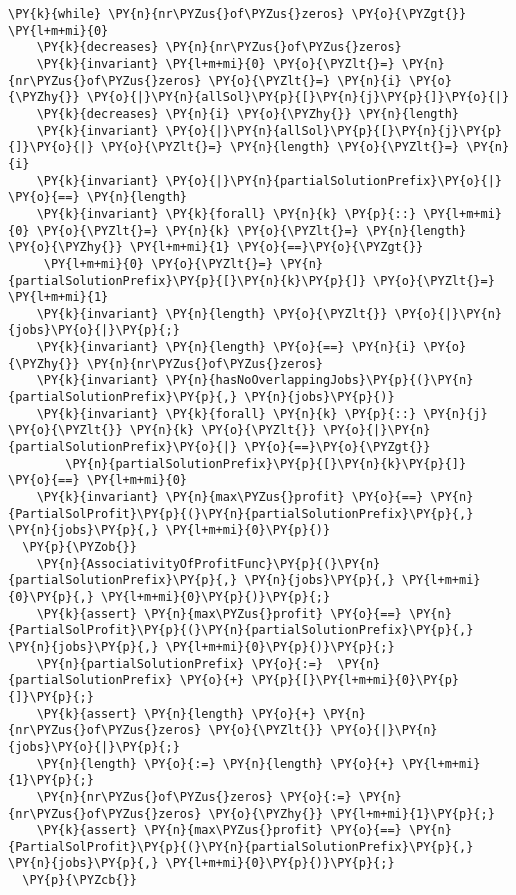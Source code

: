 \begin{Verbatim}[commandchars=\\\{\}, fontsize=\small]
  \PY{k}{while} \PY{n}{nr\PYZus{}of\PYZus{}zeros} \PY{o}{\PYZgt{}} \PY{l+m+mi}{0}
    \PY{k}{decreases} \PY{n}{nr\PYZus{}of\PYZus{}zeros}
    \PY{k}{invariant} \PY{l+m+mi}{0} \PY{o}{\PYZlt{}=} \PY{n}{nr\PYZus{}of\PYZus{}zeros} \PY{o}{\PYZlt{}=} \PY{n}{i} \PY{o}{\PYZhy{}} \PY{o}{|}\PY{n}{allSol}\PY{p}{[}\PY{n}{j}\PY{p}{]}\PY{o}{|} 
    \PY{k}{decreases} \PY{n}{i} \PY{o}{\PYZhy{}} \PY{n}{length}
    \PY{k}{invariant} \PY{o}{|}\PY{n}{allSol}\PY{p}{[}\PY{n}{j}\PY{p}{]}\PY{o}{|} \PY{o}{\PYZlt{}=} \PY{n}{length} \PY{o}{\PYZlt{}=} \PY{n}{i} 
    \PY{k}{invariant} \PY{o}{|}\PY{n}{partialSolutionPrefix}\PY{o}{|} \PY{o}{==} \PY{n}{length}
    \PY{k}{invariant} \PY{k}{forall} \PY{n}{k} \PY{p}{::} \PY{l+m+mi}{0} \PY{o}{\PYZlt{}=} \PY{n}{k} \PY{o}{\PYZlt{}=} \PY{n}{length} \PY{o}{\PYZhy{}} \PY{l+m+mi}{1} \PY{o}{==}\PY{o}{\PYZgt{}}
     \PY{l+m+mi}{0} \PY{o}{\PYZlt{}=} \PY{n}{partialSolutionPrefix}\PY{p}{[}\PY{n}{k}\PY{p}{]} \PY{o}{\PYZlt{}=} \PY{l+m+mi}{1}
    \PY{k}{invariant} \PY{n}{length} \PY{o}{\PYZlt{}} \PY{o}{|}\PY{n}{jobs}\PY{o}{|}\PY{p}{;}
    \PY{k}{invariant} \PY{n}{length} \PY{o}{==} \PY{n}{i} \PY{o}{\PYZhy{}} \PY{n}{nr\PYZus{}of\PYZus{}zeros}
    \PY{k}{invariant} \PY{n}{hasNoOverlappingJobs}\PY{p}{(}\PY{n}{partialSolutionPrefix}\PY{p}{,} \PY{n}{jobs}\PY{p}{)}
    \PY{k}{invariant} \PY{k}{forall} \PY{n}{k} \PY{p}{::} \PY{n}{j} \PY{o}{\PYZlt{}} \PY{n}{k} \PY{o}{\PYZlt{}} \PY{o}{|}\PY{n}{partialSolutionPrefix}\PY{o}{|} \PY{o}{==}\PY{o}{\PYZgt{}} 
        \PY{n}{partialSolutionPrefix}\PY{p}{[}\PY{n}{k}\PY{p}{]} \PY{o}{==} \PY{l+m+mi}{0}
    \PY{k}{invariant} \PY{n}{max\PYZus{}profit} \PY{o}{==} \PY{n}{PartialSolProfit}\PY{p}{(}\PY{n}{partialSolutionPrefix}\PY{p}{,} \PY{n}{jobs}\PY{p}{,} \PY{l+m+mi}{0}\PY{p}{)}
  \PY{p}{\PYZob{}}
    \PY{n}{AssociativityOfProfitFunc}\PY{p}{(}\PY{n}{partialSolutionPrefix}\PY{p}{,} \PY{n}{jobs}\PY{p}{,} \PY{l+m+mi}{0}\PY{p}{,} \PY{l+m+mi}{0}\PY{p}{)}\PY{p}{;} 
    \PY{k}{assert} \PY{n}{max\PYZus{}profit} \PY{o}{==} \PY{n}{PartialSolProfit}\PY{p}{(}\PY{n}{partialSolutionPrefix}\PY{p}{,} \PY{n}{jobs}\PY{p}{,} \PY{l+m+mi}{0}\PY{p}{)}\PY{p}{;}
    \PY{n}{partialSolutionPrefix} \PY{o}{:=}  \PY{n}{partialSolutionPrefix} \PY{o}{+} \PY{p}{[}\PY{l+m+mi}{0}\PY{p}{]}\PY{p}{;}
    \PY{k}{assert} \PY{n}{length} \PY{o}{+} \PY{n}{nr\PYZus{}of\PYZus{}zeros} \PY{o}{\PYZlt{}} \PY{o}{|}\PY{n}{jobs}\PY{o}{|}\PY{p}{;}
    \PY{n}{length} \PY{o}{:=} \PY{n}{length} \PY{o}{+} \PY{l+m+mi}{1}\PY{p}{;}
    \PY{n}{nr\PYZus{}of\PYZus{}zeros} \PY{o}{:=} \PY{n}{nr\PYZus{}of\PYZus{}zeros} \PY{o}{\PYZhy{}} \PY{l+m+mi}{1}\PY{p}{;}
    \PY{k}{assert} \PY{n}{max\PYZus{}profit} \PY{o}{==} \PY{n}{PartialSolProfit}\PY{p}{(}\PY{n}{partialSolutionPrefix}\PY{p}{,} \PY{n}{jobs}\PY{p}{,} \PY{l+m+mi}{0}\PY{p}{)}\PY{p}{;}
  \PY{p}{\PYZcb{}}


\end{Verbatim}
